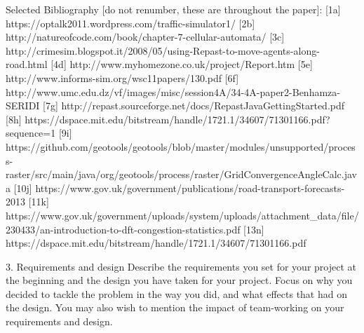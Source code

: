 \documentclass[11pt]{article}
\begin{document}
Selected Bibliography [do not renumber, these are throughout the paper]:
[1a]  https://optalk2011.wordpress.com/traffic-simulator1/
[2b]  http://natureofcode.com/book/chapter-7-cellular-automata/
[3c] http://crimesim.blogspot.it/2008/05/using-Repast-to-move-agents-along-road.html
[4d] http://www.myhomezone.co.uk/project/Report.htm
[5e] http://www.informs-sim.org/wsc11papers/130.pdf
[6f] http://www.umc.edu.dz/vf/images/misc/session4A/34-4A-paper2-Benhamza-SERIDI%
[7g] http://repast.sourceforge.net/docs/RepastJavaGettingStarted.pdf
[8h] https://dspace.mit.edu/bitstream/handle/1721.1/34607/71301166.pdf?sequence=1
[9i] https://github.com/geotools/geotools/blob/master/modules/unsupported/process-raster/src/main/java/org/geotools/process/raster/GridConvergenceAngleCalc.java
[10j] https://www.gov.uk/government/publications/road-transport-forecasts-2013
[11k] https://www.gov.uk/government/uploads/system/uploads/attachment_data/file/230433/an-introduction-to-dft-congestion-statistics.pdf
 [13n] https://dspace.mit.edu/bitstream/handle/1721.1/34607/71301166.pdf


3. Requirements and design Describe the requirements you set for your project at the beginning and the design you have taken for your project. Focus on why you decided to tackle the problem in the way you did, and what effects that had on the design. You may also wish to mention the impact of team-working on your requirements and design.
\end{document}
